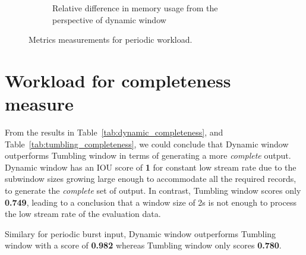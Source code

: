 \begin{figure}
\begin{subfigure}[b]{\textwidth}
        \caption{Relative difference in memory usage from the perspective of dynamic window}
        \label{fig:periodic_mem_diff}
    \end{subfigure}

    \caption{Metrics measurements for periodic workload.}%
    \label{fig:periodic_measurement}
\end{figure}

\newpage
\section{Workload for completeness measure}%
\label{sec:Workload for completeness measure}

From the results in Table~\ref{tab:dynamic_completeness}, and 
Table~\ref{tab:tumbling_completeness}, we could conclude that Dynamic window 
outperforms Tumbling window in terms of generating a more \emph{complete} output. 
Dynamic window has an IOU score of \textbf{1} for constant low stream rate
due to the subwindow sizes growing large 
enough to accommodate all the required records, to generate the \emph{complete} set 
of output. In contrast, Tumbling window scores only \textbf{0.749}, leading to 
a conclusion that a window size of 2s is not enough to process the low stream rate 
of the evaluation data. 

Similary for periodic burst input, Dynamic window outperforms Tumbling window with a
score of \textbf{0.982} whereas Tumbling window only scores \textbf{0.780}.   


\begin{table}[htbp]
    \centering
\caption{Dynamic window's completeness measurement. The \emph{Expected (triples)} are the number of triples generated by the 
bounded data processing RMLStreamer.}
\label{tab:dynamic_completeness}
\end{table}

